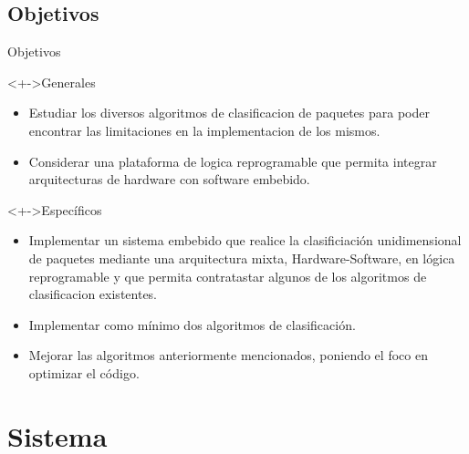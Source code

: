 \documentclass[xcolor=dvipsnames]{beamer}
\begin{document}
\subsection{Objetivos}
\begin{frame}{Objetivos}
\begin{block}<+->{Generales}   
    \begin{itemize}
      \scriptsize
      \item Estudiar los diversos algoritmos de clasificacion de paquetes para poder encontrar las limitaciones en la implementacion de los mismos.
      \item Considerar una plataforma de logica reprogramable que permita integrar arquitecturas de hardware con software embebido.
    \end{itemize}
  \end{block}
  
 \begin{block}<+->{Específicos}   
    \begin{itemize}
      \scriptsize
     \item Implementar un sistema embebido que realice la clasificiación unidimensional de paquetes mediante una arquitectura mixta, Hardware-Software, en lógica reprogramable y que permita contratastar algunos de los algoritmos de clasificacion existentes. 
	\item Implementar como mínimo dos algoritmos de clasificación. 
	\item Mejorar las algoritmos anteriormente mencionados, poniendo el foco en optimizar el código.
   
    \end{itemize}
  \end{block}
 \end{frame}

\section{Sistema}
\end{document}
